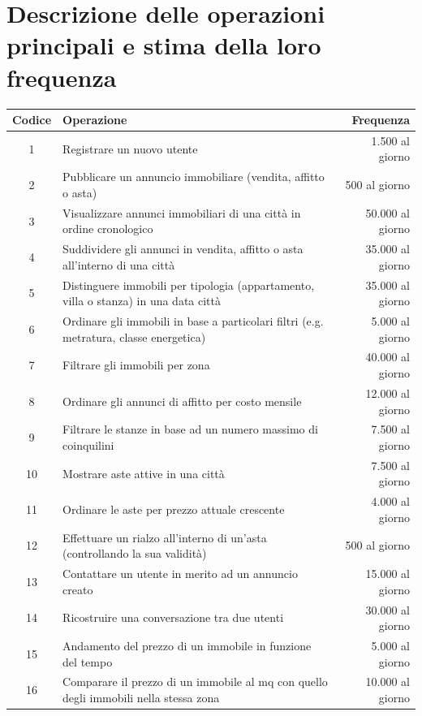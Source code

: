 \documentclass[a4paper,12pt]{report}
\begin{document}
    	\section{Descrizione delle operazioni principali e stima della loro frequenza}
        \begin{table}[h!]
            \centering
             \begin{tabular}{||c l r||}
             \hline
             Codice & Operazione & Frequenza \\ [0.5ex] 
             \hline\hline
             1 & Registrare un nuovo utente & 1.500 al giorno \\
             2 & Pubblicare un annuncio immobiliare (vendita, affitto o asta) & 500 al giorno \\
             3 & Visualizzare annunci immobiliari di una città in ordine cronologico & 50.000 al giorno \\ 
             4 & Suddividere gli annunci in vendita, affitto o asta all'interno di una città & 35.000 al giorno \\
             5 & Distinguere immobili per tipologia (appartamento, villa o stanza) in una data città & 35.000 al giorno \\
             6 & Ordinare gli immobili in base a particolari filtri (e.g. metratura, classe energetica) & 5.000 al giorno \\
             7 & Filtrare gli immobili per zona & 40.000 al giorno \\
             8 & Ordinare gli annunci di affitto per costo mensile & 12.000 al giorno \\
             9 & Filtrare le stanze in base ad un numero massimo di coinquilini & 7.500 al giorno \\
             10 & Mostrare aste attive in una città & 7.500 al giorno \\
             11 & Ordinare le aste per prezzo attuale crescente & 4.000 al giorno \\ 
             12 & Effettuare un rialzo all'interno di un'asta (controllando la sua validità) & 500 al giorno \\
             13 & Contattare un utente in merito ad un annuncio creato & 15.000 al giorno \\
             14 & Ricostruire una conversazione tra due utenti & 30.000 al giorno \\
             15 & Andamento del prezzo di un immobile in funzione del tempo & 5.000 al giorno \\
             16 & Comparare il prezzo di un immobile al mq con quello degli immobili nella stessa zona & 10.000 al giorno \\

\end{tabular}
\end{table}
\end{document}
